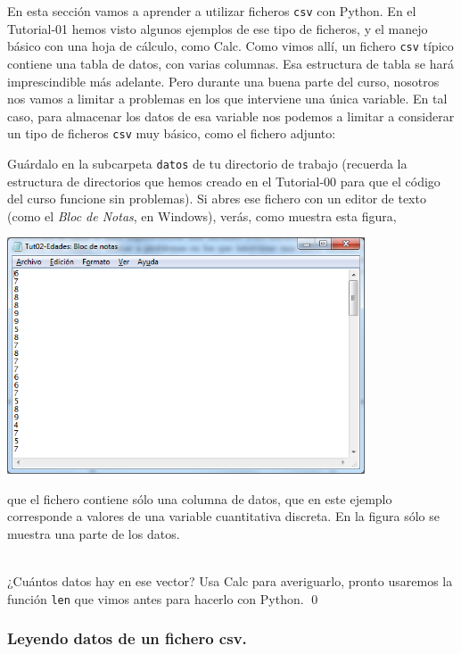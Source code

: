 \documentclass[10pt,a4paper]{article}\usepackage[]{graphicx}\usepackage[]{color}
\newcounter {cont01}
\begin{document}
En esta sección vamos a aprender a utilizar ficheros {\tt csv} con Python.  En el Tutorial-01 hemos visto algunos ejemplos de ese tipo de ficheros, y el manejo básico con una hoja de cálculo, como Calc. Como vimos allí, un fichero {\tt csv} típico contiene una tabla de datos, con varias columnas. Esa estructura de tabla se hará imprescindible más adelante. Pero durante una buena parte del curso, nosotros nos vamos a limitar a problemas en los que interviene una única variable. En tal caso, para almacenar los datos de esa variable nos podemos a limitar a considerar un tipo de ficheros {\tt csv} muy básico, como el fichero adjunto:
\begin{center}
\end{center}
Guárdalo en la subcarpeta {\tt datos} de tu directorio de trabajo (recuerda la estructura de directorios que hemos creado en el Tutorial-00 para que el código del curso funcione sin problemas). Si abres ese fichero con un editor de texto (como el {\em Bloc de Notas}, en Windows), verás, como muestra esta figura,
\begin{center}
\includegraphics[height=7cm]{../fig/Tut02-06.png}
\end{center}
que el fichero contiene  sólo una columna de datos, que en este ejemplo corresponde a valores de una variable cuantitativa discreta. En la figura sólo se muestra una parte de los datos.
\begin{ejercicio}
\label{tut02:ejercicio19}
\quad\\
¿Cuántos datos hay en ese vector? Usa Calc para averiguarlo, pronto usaremos la función {\tt len} que vimos antes para hacerlo con Python.
\qed
\end{ejercicio}

\subsubsection*{Leyendo datos de un fichero csv.}
\label{tut02:subsubsec:leyendoDatosFicheroCsv}
\end{document}

